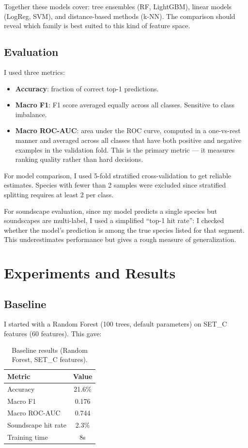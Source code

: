 \documentclass[11pt,a4paper]{article}
\begin{document}
Together these models cover: tree ensembles (RF, LightGBM), linear models (LogReg, SVM), and distance-based methods (k-NN). The comparison should reveal which family is best suited to this kind of feature space.

\subsection{Evaluation}

I used three metrics:
\begin{itemize}
    \item \textbf{Accuracy}: fraction of correct top-1 predictions.
    \item \textbf{Macro F1}: F1 score averaged equally across all classes. Sensitive to class imbalance.
    \item \textbf{Macro ROC-AUC}: area under the ROC curve, computed in a one-vs-rest manner and averaged across all classes that have both positive and negative examples in the validation fold. This is the primary metric — it measures ranking quality rather than hard decisions.
\end{itemize}

For model comparison, I used 5-fold stratified cross-validation to get reliable estimates. Species with fewer than 2 samples were excluded since stratified splitting requires at least 2 per class.

For soundscape evaluation, since my model predicts a single species but soundscapes are multi-label, I used a simplified ``top-1 hit rate'': I checked whether the model's prediction is among the true species listed for that segment. This underestimates performance but gives a rough measure of generalization.

\section{Experiments and Results}

\subsection{Baseline}

I started with a Random Forest (100 trees, default parameters) on SET\_C features (60 features). This gave:

\begin{table}[H]
\centering
\begin{tabular}{lc}
\toprule
Metric & Value \\
\midrule
Accuracy & 21.6\% \\
Macro F1 & 0.176 \\
Macro ROC-AUC & 0.744 \\
Soundscape hit rate & 2.3\% \\
Training time & 8s \\
\bottomrule
\end{tabular}
\caption{Baseline results (Random Forest, SET\_C features).}
\label{tab:baseline}
\end{table}
\end{document}
